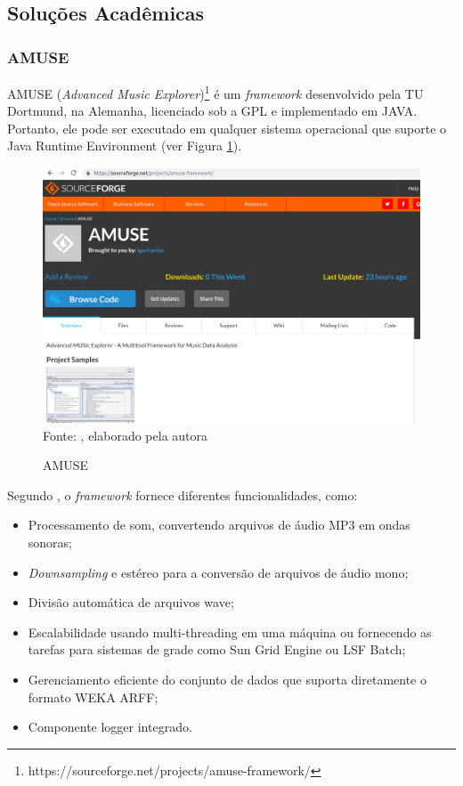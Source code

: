 \subsection{Soluções Acadêmicas} \label{sec:academico}

\subsubsection{AMUSE} \label{subsec:amuse}
AMUSE (\textit{Advanced Music Explorer})\footnote{https://sourceforge.net/projects/amuse-framework/} é um \textit{framework} desenvolvido pela TU Dortmund, na Alemanha, licenciado sob a GPL e implementado em JAVA. Portanto, ele pode ser executado em qualquer sistema operacional que suporte o Java Runtime Environment (ver Figura \ref{fig:amuse}).

\begin{figure}[!htb]
   \centering
   \caption{AMUSE}\label{fig:amuse} 
   \includegraphics[scale=0.27]{figuras/amuse.png}
   \\Fonte: \cite{amuse}, elaborado pela autora
\end{figure}

Segundo \cite{vatolkin2010}, o \textit{framework} fornece diferentes funcionalidades, como:

\begin{itemize}
    \item Processamento de som, convertendo arquivos de áudio MP3 em ondas sonoras;
    \item \textit{Downsampling} e estéreo para a conversão de arquivos de áudio mono;
    \item Divisão automática de arquivos wave;
    \item Escalabilidade usando multi-threading em uma máquina ou fornecendo as tarefas para sistemas de grade como Sun Grid Engine ou LSF Batch;
    \item Gerenciamento eficiente do conjunto de dados que suporta diretamente o formato WEKA ARFF;
    \item Componente logger integrado.
\end{itemize}

